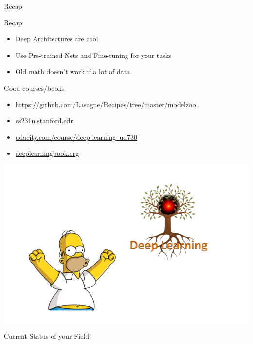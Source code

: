 \documentclass{beamer}
\begin{document}
\begin{frame}{Recap}
	
 	Recap:
	\begin{itemize}
		\item Deep Architectures are cool
		\item Use Pre-trained Nets and Fine-tuning for your tasks
		\item Old math doesn't work if a lot of data 
	\end{itemize}
	
	\vspace{1cm}
 	Good courses/books
	\begin{itemize}
		\item \href{https://github.com/Lasagne/Recipes/tree/master/modelzoo}{https://github.com/Lasagne/Recipes/tree/master/modelzoo}
		\item \href{cs231n.stanford.edu}{cs231n.stanford.edu}
		\item \href{udacity.com/course/deep-learning--ud730}{udacity.com/course/deep-learning--ud730}
		\item \href{deeplearningbook.org}{deeplearningbook.org}
	\end{itemize}
\end{frame}
\begin{frame}{} 
	\begin{center}				
		\includegraphics[scale=0.35]{img/csf}
		
		{\huge Current Status of your Field!}

	\end{center}
\end{frame}
\end{document}
